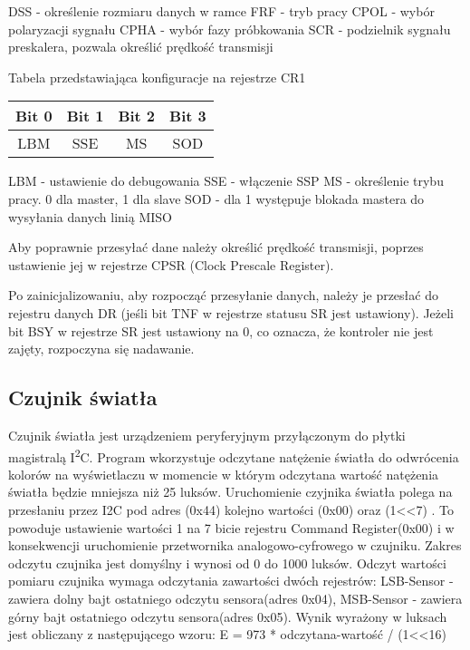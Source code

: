 \documentclass{classrep}
\begin{document}
	 
	 \textbullet DSS  - określenie rozmiaru danych w ramce
	 \textbullet FRF  - tryb pracy
	 \textbullet CPOL - wybór polaryzacji sygnału
	 \textbullet CPHA - wybór fazy próbkowania
	 \textbullet SCR  - podzielnik sygnału preskalera, pozwala określić prędkość transmisji 
		  
			 
		\begin{center}
			Tabela przedstawiająca konfiguracje na rejestrze CR1
			
			
			\begin{tabular}{|c|c|c|c|}
				\hline 
				Bit 0  & Bit 1  & Bit 2  & Bit 3  \\ 
				\hline 
				LBM & SSE  & MS  & SOD \\ 
				\hline 
			\end{tabular} 
		\end{center}
	
	\textbullet LBM - ustawienie do debugowania
	\textbullet SSE - włączenie SSP
	\textbullet MS  - określenie trybu pracy. 0 dla master, 1 dla slave
	\textbullet SOD - dla 1 występuje blokada mastera do wysyłania danych linią MISO
	
	
	Aby poprawnie przesyłać dane należy określić prędkość transmisji, poprzes ustawienie jej w rejestrze CPSR (Clock Prescale Register).
	
	
	Po zainicjalizowaniu, aby rozpocząć przesyłanie danych, należy je przesłać do rejestru danych DR (jeśli bit TNF w rejestrze statusu SR jest ustawiony). Jeżeli bit BSY w rejestrze SR jest ustawiony na 0, co oznacza, że kontroler nie jest zajęty, rozpoczyna się nadawanie.
		
		\subsection{Czujnik światła}
Czujnik światła jest urządzeniem peryferyjnym przyłączonym do płytki magistralą I\textsuperscript2C. Program wkorzystuje odczytane natężenie światła do odwrócenia kolorów na 			wyświetlaczu w momencie w którym odczytana wartość natężenia światła będzie mniejsza niż 25 luksów. Uruchomienie czyjnika światła polega na przesłaniu przez	
I2C pod adres (0x44) kolejno wartości (0x00) oraz (1<<7) . To powoduje ustawienie wartości 1 na 7 bicie rejestru Command Register(0x00) i w konsekwencji 	uruchomienie przetwornika analogowo-cyfrowego w czujniku. Zakres odczytu czujnika jest domyślny i wynosi od 0 do 1000 luksów. Odczyt wartości pomiaru czujnika wymaga 				odczytania zawartości dwóch rejestrów:  LSB-Sensor - zawiera dolny bajt ostatniego odczytu sensora(adres 0x04), MSB-Sensor - zawiera górny bajt ostatniego odczytu 					sensora(adres 0x05). Wynik wyrażony w luksach jest obliczany z następującego wzoru: E = 973 * odczytana-wartość /  (1<<16)
\end{document}

